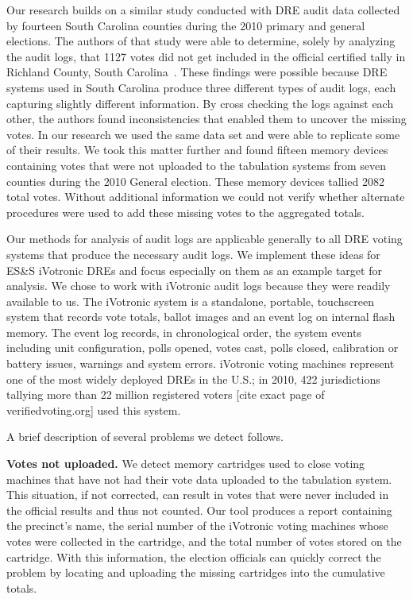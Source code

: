 Our research builds on a similar study conducted with DRE audit data collected by fourteen South Carolina counties during the 2010 primary and general elections.  The authors of that study were able to determine, solely by analyzing the audit logs, that 1127 votes did not get included in the official certified tally in Richland County, South Carolina~\cite{Buell2011}. These findings were possible because DRE systems used in South Carolina produce three different types of audit logs, each capturing slightly different information. By cross checking the logs against each other, the authors found inconsistencies that enabled them to uncover the missing votes. In our research we used the same data set and were able to replicate some of their results. We took this matter further and found fifteen memory devices containing votes that were not uploaded to the tabulation systems from seven counties during the 2010 General election. These memory devices tallied 2082 total votes. Without additional information we could not verify whether alternate procedures were used to add these missing votes to the aggregated totals. 

Our methods for analysis of audit logs are applicable generally to all DRE voting systems  that produce the necessary audit logs. We implement these ideas for ES\&S iVotronic DREs and focus especially on them as an example target for analysis.  We chose to work with iVotronic audit logs because they were readily available to us. The iVotronic system is a standalone, portable, touchscreen system that records vote totals, ballot images and an event log on internal flash memory. The event log records, in chronological order, the system events including unit configuration, polls opened, votes cast, polls closed, calibration or battery issues, warnings and system errors. iVotronic voting machines represent one of the most widely deployed DREs in the U.S.; in 2010, 422 jurisdictions tallying more than 22 million registered voters [cite exact page of verifiedvoting.org] used this system.
 
A brief description of several problems we detect follows.

\textbf{Votes not uploaded.} We detect  memory cartridges used to close voting machines that have not had their vote data uploaded to the tabulation system. This situation, if not corrected, can result in votes that were never included in the official results and thus not counted. Our tool produces a report containing the precinct's name, the serial number of the iVotronic voting machines whose votes were collected in the cartridge, and the total number of votes stored on the cartridge. With this information, the election officials can quickly correct the problem by locating and uploading the missing cartridges into the cumulative totals.

